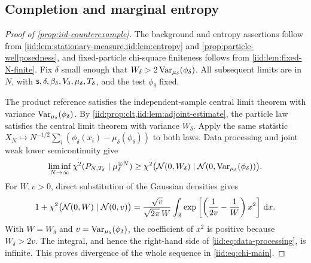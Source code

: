 \documentclass[11pt,reqno]{amsart}
\numberwithin{equation}{section}
\theoremstyle{plain}
\theoremstyle{remark}
\begin{document}
\subsection{Completion and marginal entropy}\label{iid:subsec:completion}
\begin{proof}[Proof of \cref{prop:iid-counterexample}]
The background and entropy assertions follow from \cref{iid:lem:stationary-measure,iid:lem:entropy} and \cref{prop:particle-wellposedness}, and fixed-particle chi-square finiteness follows from \cref{iid:lem:fixed-N-finite}. Fix $\delta$ small enough that $W_\delta>2\operatorname{Var}_{\mu_\delta}(\phi_\delta)$. All subsequent limits are in $N$, with $\mathsf{s},\delta,\beta_\delta,V_\delta,\mu_\delta,T_\delta$, and the test $\phi_\delta$ fixed.

The product reference satisfies the independent-sample central limit theorem with variance $\operatorname{Var}_{\mu_\delta}(\phi_\delta)$. By \cref{iid:prop:clt,iid:lem:adjoint-estimate}, the particle law satisfies the central limit theorem with variance $W_\delta$. Apply the same statistic $X_N\mapsto N^{-1/2}\sum_i(\phi_\delta(x_i)-\mu_\delta(\phi_\delta))$ to both laws. Data processing and joint weak lower semicontinuity \cite[Theorem 19 and (6)]{vanErvenHarremoes2014} give
\begin{equation}\label{iid:eq:data-processing}
 \liminf_{N\to\infty}\chi^2(P_{N,T_\delta}\mid\mu_\delta^{\otimes N})
 \ge\chi^2\bigl(\mathcal N(0,W_\delta)\mid\mathcal N(0,\operatorname{Var}_{\mu_\delta}(\phi_\delta))\bigr).
\end{equation}
For $W,v>0$, direct substitution of the Gaussian densities gives
\begin{equation}\label{iid:eq:Gaussian-threshold}
 1+\chi^2\bigl(\mathcal N(0,W)\mid\mathcal N(0,v)\bigr)
 =\frac{\sqrt v}{\sqrt{2\pi}\,W}
 \int_\mathbb R\exp\left[\left(\frac1{2v}-\frac1W\right)x^2\right]\,\mathrm d x.
\end{equation}
With $W=W_\delta$ and $v=\operatorname{Var}_{\mu_\delta}(\phi_\delta)$, the coefficient of $x^2$ is positive because $W_\delta>2v$. The integral, and hence the right-hand side of \eqref{iid:eq:data-processing}, is infinite. This proves divergence of the whole sequence in \eqref{iid:eq:chi-main}.
\end{proof}
\end{document}

